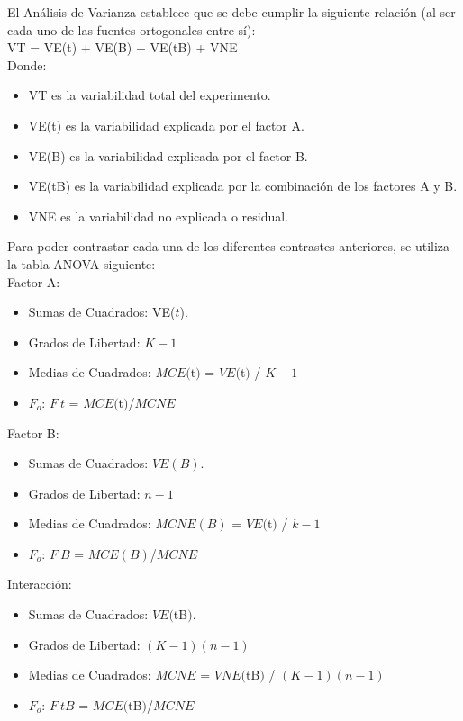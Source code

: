 \documentclass[12pt,letterpaper]{article}\usepackage[]{graphicx}\usepackage[]{color}
\begin{document}
El An\'alisis de Varianza establece que se debe cumplir la siguiente relaci\'on (al ser cada uno de las fuentes ortogonales entre s\'i):\\

VT = VE(t) + VE(B) + VE(tB) + VNE\\

Donde: 
\begin{itemize}
  \item VT es la variabilidad total del experimento.
  \item VE(t) es la variabilidad explicada por el factor A.
  \item VE(B) es la variabilidad explicada por el factor B. 
  \item VE(tB) es la variabilidad explicada por la combinaci\'on de los factores A y B. 
  \item VNE es la variabilidad no explicada o residual.
\end{itemize}

Para poder contrastar cada una de los diferentes contrastes anteriores, se utiliza la tabla ANOVA siguiente:\\

Factor A:
\begin{itemize}
  \item Sumas de Cuadrados: VE($t$).
  \item Grados de Libertad: $K-1$
  \item Medias de Cuadrados: $MCE($t$)$ = $VE($t$)$ / $K-1$ 
  \item $F_o$: $F_\ t$ = $MCE($t$)$/$MCNE$
\end{itemize}

Factor B:
\begin{itemize}
  \item Sumas de Cuadrados: $VE(B)$.
  \item Grados de Libertad: $n - 1$
  \item Medias de Cuadrados: $MCNE(B)$ = $VE($t$)$ / $k-1$
  \item $F_o$: $F_\ B$ = $MCE(B)$/$MCNE$
\end{itemize}

Interacci\'on:
\begin{itemize}
  \item Sumas de Cuadrados: $VE($tB$)$.
  \item Grados de Libertad: $(K - 1)(n - 1)$
  \item Medias de Cuadrados: $MCNE$ = $VNE($tB$)$ / $(K - 1)(n - 1)$
  \item $F_o$: $F_\ tB$ = $MCE($tB$)$/$MCNE$
\end{itemize}
\end{document}
